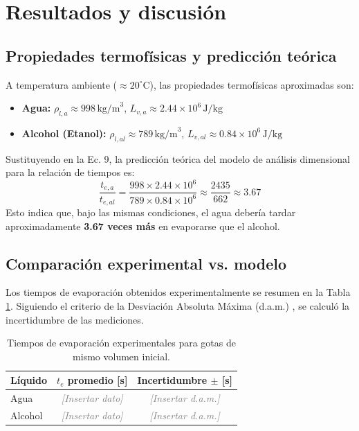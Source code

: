 \documentclass[12pt, letterpaper, onecolumn]{article}
\begin{document}
\section{Resultados y discusión}\label{sec:resultados}

\subsection{Propiedades termofísicas y predicción teórica}
A temperatura ambiente ($\approx 20^\circ\text{C}$), las propiedades termofísicas aproximadas son:
\begin{itemize}
  \item \textbf{Agua:} $\rho_{l,a} \approx 998 \, \text{kg/m}^3$, $L_{v,a} \approx 2.44 \times 10^6 \, \text{J/kg}$
  \item \textbf{Alcohol (Etanol):} $\rho_{l,al} \approx 789 \, \text{kg/m}^3$, $L_{v,al} \approx 0.84 \times 10^6 \, \text{J/kg}$
\end{itemize}

Sustituyendo en la Ec. 9, la predicción teórica del modelo de análisis dimensional para la relación de tiempos es:
\begin{equation}
\frac{t_{e,a}}{t_{e,al}} = \frac{998 \times 2.44 \times 10^6}{789 \times 0.84 \times 10^6} \approx \frac{2435}{662} \approx 3.67
\end{equation}
Esto indica que, bajo las mismas condiciones, el agua debería tardar aproximadamente \textbf{3.67 veces más} en evaporarse que el alcohol.

\subsection{Comparación experimental vs. modelo}
Los tiempos de evaporación obtenidos experimentalmente se resumen en la Tabla \ref{tab:tiempos}. Siguiendo el criterio de la Desviación Absoluta Máxima (d.a.m.) \citep{taylor1997, manualgrafico}, se calculó la incertidumbre de las mediciones.

\begin{table}[htbp]
  \centering
  \caption{Tiempos de evaporación experimentales para gotas de mismo volumen inicial.}
  \label{tab:tiempos}
  \begin{tabular}{@{}lcc@{}}
    \toprule
    Líquido & $t_e$ promedio [s] & Incertidumbre $\pm$ [s] \\
    \midrule
    Agua     & \textcolor{gray}{\textit{[Insertar dato]}} & \textcolor{gray}{\textit{[Insertar d.a.m.]}} \\
    Alcohol  & \textcolor{gray}{\textit{[Insertar dato]}} & \textcolor{gray}{\textit{[Insertar d.a.m.]}} \\
    \bottomrule
  \end{tabular}
\end{table}
\end{document}
